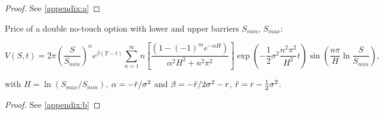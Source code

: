 \begin{proof}
    See \ref{appendix:a}
\end{proof}




\begin{proposition}
    Price of a double no-touch option with lower and upper barriers $S_{min}$, $S_{max}$:

\[
V(S,t) = 2\pi \left(\dfrac{S}{S_{min}}\right)^{\alpha} e^{\beta(T-t)} \sum_{n=1}^{\infty} n \left[\dfrac{(1 - (-1)^{m}e^{-\alpha H})}{\alpha^2 H^2 + n^2 \pi^2} \right] \exp \left(-\frac{1}{2}\sigma^2 \dfrac{n^2 \pi^2}{H^2} t \right) \sin \left(\dfrac{n\pi}{H} \ln \frac{S}{S_{min}} \right),
\]

with $H=\ln(S_{max}/S_{min})$, $\alpha = -\Tilde{r}/\sigma^2$ and $\beta = -\Tilde{r}/ 2\sigma^2 - r$, $\Tilde{r} = r - \frac{1}{2}\sigma^2$.
\end{proposition}

\begin{proof}
    See \ref{appendix:b}
\end{proof}